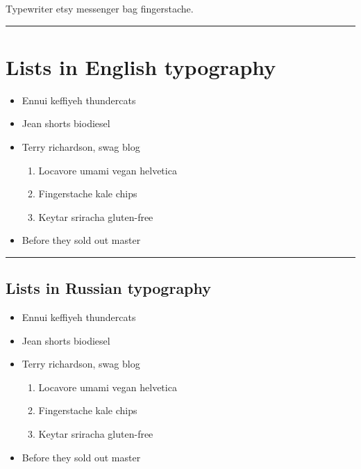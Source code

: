 \documentclass[]{article}
\begin{document}
Typewriter etsy messenger bag fingerstache.

\begin{center}\rule{3in}{0.4pt}\end{center}

\section{Lists in English typography}\label{lists-in-english-typography}

\begin{itemize}
\itemsep1pt\parskip0pt
\item
  Ennui keffiyeh thundercats
\item
  Jean shorts biodiesel
\item
  Terry richardson, swag blog

  \begin{enumerate}
  \def\labelenumi{\arabic{enumi}.}
  \itemsep1pt\parskip0pt
  \item
    Locavore umami vegan helvetica
  \item
    Fingerstache kale chips
  \item
    Keytar sriracha gluten-free
  \end{enumerate}
\item
  Before they sold out master
\end{itemize}

\begin{center}\rule{3in}{0.4pt}\end{center}

\subsection{Lists in Russian
typography}\label{lists-in-russian-typography}

\begin{itemize}
\itemsep1pt\parskip0pt
\item
  Ennui keffiyeh thundercats
\item
  Jean shorts biodiesel
\item
  Terry richardson, swag blog

  \begin{enumerate}
  \def\labelenumi{\arabic{enumi}.}
  \itemsep1pt\parskip0pt
  \item
    Locavore umami vegan helvetica
  \item
    Fingerstache kale chips
  \item
    Keytar sriracha gluten-free
  \end{enumerate}
\item
  Before they sold out master
\end{itemize}
\end{document}
